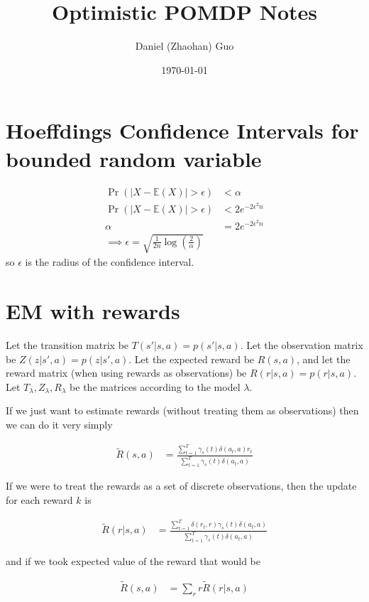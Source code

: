 \documentclass[10pt,english]{article}
\title{Optimistic POMDP Notes}
\author{Daniel (Zhaohan) Guo}
\date{\today}
\begin{document}
\maketitle

\section{Hoeffdings Confidence Intervals for bounded random variable}

\begin{align}
\Pr(|X-\mathbb{E}(X)| > \epsilon) &< \alpha \\
\Pr(|X-\mathbb{E}(X)| > \epsilon) &< 2e^{-2\epsilon^2n}\\
\alpha &= 2e^{-2\epsilon^2n}\\
\implies \epsilon = \sqrt{\frac{1}{2n}\log\left(\frac{2}{\alpha}\right)}
\end{align}
so $\epsilon$ is the radius of the confidence interval.

\section{EM with rewards}

Let the transition matrix be $T(s'|s,a) = p(s'|s,a)$. Let the observation matrix be $Z(z|s',a)=p(z|s',a)$. Let the expected reward be $R(s,a)$, and let the reward matrix (when using rewards as observations) be $R(r|s,a)=p(r|s,a)$. Let $T_{\lambda},Z_\lambda,R_\lambda$ be the matrices according to the model $\lambda$.

If we just want to estimate rewards (without treating them as observations) then we can do it very simply

\begin{align}
\tilde{R}(s,a) &= \frac{\sum_{t=1}^{T}\gamma_{s}(t)\delta(a_t,a) r_t}{\sum_{t=1}^{T}\gamma_{s}(t)\delta(a_t,a)}
\end{align}

If we were to treat the rewards as a set of discrete observations, then the update for each reward $k$ is

\begin{align}
\tilde{R}(r|s,a) &= \frac{\sum_{t=1}^{T}\delta(r_t,r) \gamma_{s}(t)\delta(a_t,a)}{\sum_{t=1}^{T}\gamma_{s}(t)\delta(a_t,a)}
\end{align}

and if we took expected value of the reward that would be

\begin{align}
\tilde{R}(s,a) &= \sum_r r\tilde{R}(r|s,a)
\end{align}
\end{document}
